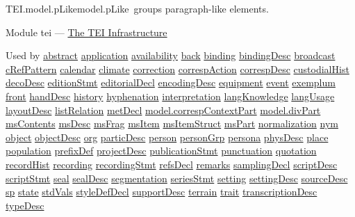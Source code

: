 \begin{reflist}
\item[]\begin{specHead}{TEI.model.pLike}{model.pLike} groups paragraph-like elements.\end{specHead} 
    \item[{Module}]
  tei — \hyperref[ST]{The TEI Infrastructure}
    \item[{Used by}]
  \hyperref[TEI.abstract]{abstract} \hyperref[TEI.application]{application} \hyperref[TEI.availability]{availability} \hyperref[TEI.back]{back} \hyperref[TEI.binding]{binding} \hyperref[TEI.bindingDesc]{bindingDesc} \hyperref[TEI.broadcast]{broadcast} \hyperref[TEI.cRefPattern]{cRefPattern} \hyperref[TEI.calendar]{calendar} \hyperref[TEI.climate]{climate} \hyperref[TEI.correction]{correction} \hyperref[TEI.correspAction]{correspAction} \hyperref[TEI.correspDesc]{correspDesc} \hyperref[TEI.custodialHist]{custodialHist} \hyperref[TEI.decoDesc]{decoDesc} \hyperref[TEI.editionStmt]{editionStmt} \hyperref[TEI.editorialDecl]{editorialDecl} \hyperref[TEI.encodingDesc]{encodingDesc} \hyperref[TEI.equipment]{equipment} \hyperref[TEI.event]{event} \hyperref[TEI.exemplum]{exemplum} \hyperref[TEI.front]{front} \hyperref[TEI.handDesc]{handDesc} \hyperref[TEI.history]{history} \hyperref[TEI.hyphenation]{hyphenation} \hyperref[TEI.interpretation]{interpretation} \hyperref[TEI.langKnowledge]{langKnowledge} \hyperref[TEI.langUsage]{langUsage} \hyperref[TEI.layoutDesc]{layoutDesc} \hyperref[TEI.listRelation]{listRelation} \hyperref[TEI.metDecl]{metDecl} \hyperref[TEI.model.correspContextPart]{model.correspContextPart} \hyperref[TEI.model.divPart]{model.divPart} \hyperref[TEI.msContents]{msContents} \hyperref[TEI.msDesc]{msDesc} \hyperref[TEI.msFrag]{msFrag} \hyperref[TEI.msItem]{msItem} \hyperref[TEI.msItemStruct]{msItemStruct} \hyperref[TEI.msPart]{msPart} \hyperref[TEI.normalization]{normalization} \hyperref[TEI.nym]{nym} \hyperref[TEI.object]{object} \hyperref[TEI.objectDesc]{objectDesc} \hyperref[TEI.org]{org} \hyperref[TEI.particDesc]{particDesc} \hyperref[TEI.person]{person} \hyperref[TEI.personGrp]{personGrp} \hyperref[TEI.persona]{persona} \hyperref[TEI.physDesc]{physDesc} \hyperref[TEI.place]{place} \hyperref[TEI.population]{population} \hyperref[TEI.prefixDef]{prefixDef} \hyperref[TEI.projectDesc]{projectDesc} \hyperref[TEI.publicationStmt]{publicationStmt} \hyperref[TEI.punctuation]{punctuation} \hyperref[TEI.quotation]{quotation} \hyperref[TEI.recordHist]{recordHist} \hyperref[TEI.recording]{recording} \hyperref[TEI.recordingStmt]{recordingStmt} \hyperref[TEI.refsDecl]{refsDecl} \hyperref[TEI.remarks]{remarks} \hyperref[TEI.samplingDecl]{samplingDecl} \hyperref[TEI.scriptDesc]{scriptDesc} \hyperref[TEI.scriptStmt]{scriptStmt} \hyperref[TEI.seal]{seal} \hyperref[TEI.sealDesc]{sealDesc} \hyperref[TEI.segmentation]{segmentation} \hyperref[TEI.seriesStmt]{seriesStmt} \hyperref[TEI.setting]{setting} \hyperref[TEI.settingDesc]{settingDesc} \hyperref[TEI.sourceDesc]{sourceDesc} \hyperref[TEI.sp]{sp} \hyperref[TEI.state]{state} \hyperref[TEI.stdVals]{stdVals} \hyperref[TEI.styleDefDecl]{styleDefDecl} \hyperref[TEI.supportDesc]{supportDesc} \hyperref[TEI.terrain]{terrain} \hyperref[TEI.trait]{trait} \hyperref[TEI.transcriptionDesc]{transcriptionDesc} \hyperref[TEI.typeDesc]{typeDesc}

\end{reflist}
